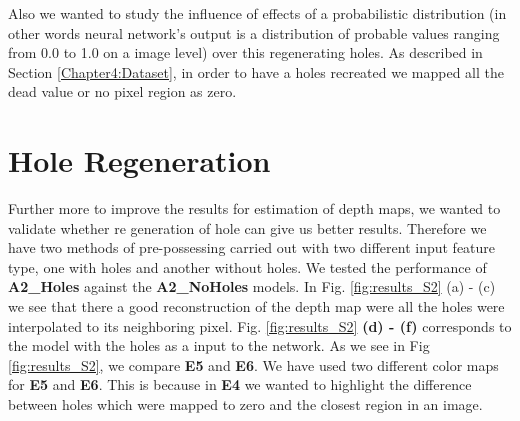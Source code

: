  Also we wanted to study the influence of effects of a probabilistic distribution (in other words neural network's output is a distribution of probable values ranging from 0.0 to 1.0 on a image level) over this regenerating holes. As described in Section \ref{Chapter4:Dataset}, in order to have a holes recreated we mapped all the dead value or no pixel region as zero.


 \section{Hole Regeneration}
 \label{Chapter6:Hole_Regeneration}


Further more to improve the results for estimation of depth maps, we wanted to validate whether re generation of hole can give us better results. Therefore we have two methods of pre-possessing carried out with two different input feature type, one with holes and another without holes. We tested the performance of \textbf{A2\_Holes} against the \textbf{A2\_NoHoles} models. In Fig. \ref{fig:results_S2} (a) - (c) we see that there a good reconstruction of the depth map were all the holes were interpolated to its neighboring pixel.  Fig. \ref{fig:results_S2} \textbf{(d) - (f)}  corresponds to the model with the holes as a input to the network. As we see in Fig \ref{fig:results_S2}, we compare \textbf{E5} and \textbf{E6}. We have used two different color maps for \textbf{E5} and \textbf{E6}. This is because in \textbf{E4} we wanted to highlight the difference between holes which were mapped to zero and the closest region in an image. 


